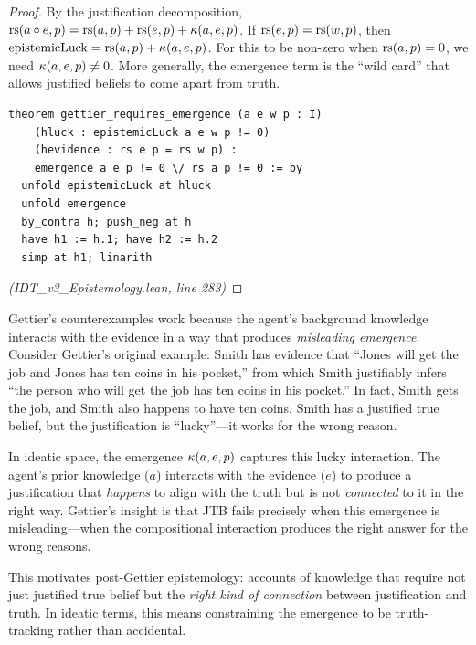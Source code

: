 \begin{proof}
By the justification decomposition,
$\mathrm{rs}(a \circ e, p) = \mathrm{rs}(a, p) + \mathrm{rs}(e, p) + \kappa(a, e, p)$.
If $\mathrm{rs}(e, p) = \mathrm{rs}(w, p)$, then
$\mathrm{epistemicLuck} = \mathrm{rs}(a, p) + \kappa(a, e, p)$.
For this to be non-zero when $\mathrm{rs}(a, p) = 0$, we need $\kappa(a, e, p) \neq 0$.
More generally, the emergence term is the ``wild card'' that allows justified
beliefs to come apart from truth.
\begin{lstlisting}
theorem gettier_requires_emergence (a e w p : I)
    (hluck : epistemicLuck a e w p != 0)
    (hevidence : rs e p = rs w p) :
    emergence a e p != 0 \/ rs a p != 0 := by
  unfold epistemicLuck at hluck
  unfold emergence
  by_contra h; push_neg at h
  have h1 := h.1; have h2 := h.2
  simp at h1; linarith
\end{lstlisting}
\textit{(IDT\_v3\_Epistemology.lean, line 283)}
\end{proof}

\begin{interpretation}
Gettier's counterexamples work because the agent's background knowledge interacts
with the evidence in a way that produces \emph{misleading emergence}. Consider
Gettier's original example: Smith has evidence that ``Jones will get the job and
Jones has ten coins in his pocket,'' from which Smith justifiably infers ``the
person who will get the job has ten coins in his pocket.'' In fact, Smith gets
the job, and Smith also happens to have ten coins. Smith has a justified true
belief, but the justification is ``lucky''---it works for the wrong reason.

In ideatic space, the emergence $\kappa(a, e, p)$ captures this lucky
interaction. The agent's prior knowledge ($a$) interacts with the evidence ($e$)
to produce a justification that \emph{happens} to align with the truth but is
not \emph{connected} to it in the right way. Gettier's insight is that JTB
fails precisely when this emergence is misleading---when the compositional
interaction produces the right answer for the wrong reasons.

This motivates post-Gettier epistemology: accounts of knowledge that require
not just justified true belief but the \emph{right kind of connection} between
justification and truth. In ideatic terms, this means constraining the emergence
to be truth-tracking rather than accidental.
\end{interpretation}

